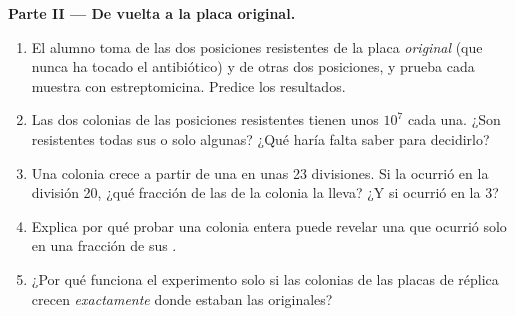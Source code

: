 \begin{problem}
\medskip
\noindent\textbf{Parte II --- De vuelta a la placa original.}
\begin{enumerate}[resume]
  \item El alumno toma  de las dos posiciones resistentes de la
        placa \emph{original} (que nunca ha tocado el antibiótico) y de
        otras dos posiciones, y prueba cada muestra con estreptomicina.
        Predice los resultados.
  \item Las dos colonias de las posiciones resistentes tienen unos
        $10^7$  cada una. ¿Son resistentes todas sus  o
        solo algunas? ¿Qué haría falta saber para decidirlo?
  \item Una colonia crece a partir de una  en unas 23 divisiones.
        Si la  ocurrió en la división 20, ¿qué fracción de las
         de la colonia la lleva? ¿Y si ocurrió en la 3?
  \item Explica por qué probar una colonia entera puede revelar una
         que ocurrió solo en una fracción de sus .
  \item ¿Por qué funciona el experimento solo si las colonias de las
        placas de réplica crecen \emph{exactamente} donde estaban las
        originales?
\end{enumerate}


\end{problem}
